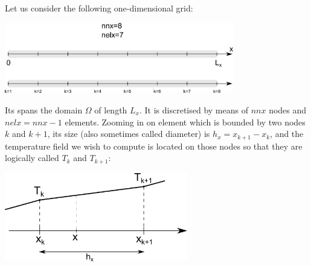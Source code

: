 Let us consider the following one-dimensional grid: 
\begin{center}
\includegraphics[width=10cm]{images/oneD/domain}
\end{center}
Its spans the domain $\Omega$ of length $L_x$. 
It is discretised by means of 
$nnx$ nodes and $nelx=nnx-1$ elements.
Zooming in on element which is bounded by two nodes $k$ and $k+1$,
its size (also sometimes called diameter) is $h_x=x_{k+1}-x_k$, 
and the temperature field we wish to compute is located on those 
nodes so that they are logically called $T_k$ and $T_{k+1}$:

\begin{center}
\includegraphics[width=8cm]{images/oneD/el1D}
\end{center}

